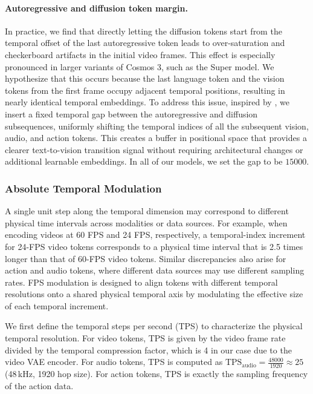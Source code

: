 \paragraph{Autoregressive and diffusion token margin.} In practice, we find that directly letting the diffusion tokens start from the temporal offset of the last autoregressive token leads to over-saturation and checkerboard artifacts in the initial video frames. This effect is especially pronounced in larger variants of Cosmos 3, such as the Super model. We hypothesize that this occurs because the last language token and the vision tokens from the first frame occupy adjacent temporal positions, resulting in nearly identical temporal embeddings. To address this issue, inspired by \citet{cao2025hunyuanimage}, we insert a fixed temporal gap between the autoregressive and diffusion subsequences, uniformly shifting the temporal indices of all the subsequent vision, audio, and action tokens. This creates a buffer in positional space that provides a clearer text-to-vision transition signal without requiring architectural changes or additional learnable embeddings. In all of our models, we set the gap to be $15000$.

\subsubsection{Absolute Temporal Modulation}
A single unit step along the temporal dimension may correspond to different physical time intervals across modalities or data sources. For example, when encoding videos at 60 FPS and 24 FPS, respectively, a temporal-index increment for 24-FPS video tokens corresponds to a physical time interval that is 2.5 times longer than that of 60-FPS video tokens. Similar discrepancies also arise for action and audio tokens, where different data sources may use different sampling rates. FPS modulation is designed to align tokens with different temporal resolutions onto a shared physical temporal axis by modulating the effective size of each temporal increment.

We first define the temporal steps per second (TPS) to characterize the physical temporal resolution. For video tokens, TPS is given by the video frame rate divided by the temporal compression factor, which is 4 in our case due to the video VAE encoder. For audio tokens, TPS is computed as $\mathrm{TPS}_{\mathrm{audio}} = \frac{48000}{1920} \approx 25$ (48\,kHz, 1920 hop size). For action tokens, TPS is exactly the sampling frequency of the action data.

